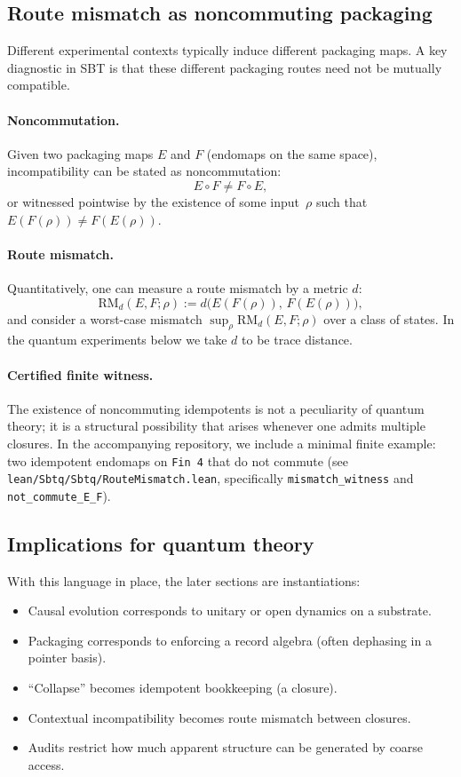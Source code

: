 \subsection{Route mismatch as noncommuting packaging}

Different experimental contexts typically induce different packaging maps.
A key diagnostic in SBT is that these different packaging routes need not be mutually compatible.

\paragraph{Noncommutation.}
Given two packaging maps $E$ and $F$ (endomaps on the same space), incompatibility can be stated as noncommutation:
\[
E\circ F \neq F\circ E,
\]
or witnessed pointwise by the existence of some input~$\rho$ such that $E(F(\rho))\neq F(E(\rho))$.

\paragraph{Route mismatch.}
Quantitatively, one can measure a route mismatch by a metric $d$:
\[
\mathrm{RM}_d(E,F;\rho) := d\big(E(F(\rho)),\,F(E(\rho))\big),
\]
and consider a worst-case mismatch $\sup_\rho \mathrm{RM}_d(E,F;\rho)$ over a class of states.
In the quantum experiments below we take $d$ to be trace distance.

\paragraph{Certified finite witness.}
The existence of noncommuting idempotents is not a peculiarity of quantum theory; it is a structural possibility that arises whenever one admits multiple closures.
In the accompanying repository, we include a minimal finite example: two idempotent endomaps on \texttt{Fin~4} that do not commute (see \texttt{lean/Sbtq/Sbtq/RouteMismatch.lean}, specifically \texttt{mismatch\_witness} and \texttt{not\_commute\_E\_F}).

\subsection{Implications for quantum theory}

With this language in place, the later sections are instantiations:
\begin{itemize}
  \item Causal evolution corresponds to unitary or open dynamics on a substrate.
  \item Packaging corresponds to enforcing a record algebra (often dephasing in a pointer basis).
  \item ``Collapse'' becomes idempotent bookkeeping (a closure).
  \item Contextual incompatibility becomes route mismatch between closures.
  \item Audits restrict how much apparent structure can be generated by coarse access.
\end{itemize}
